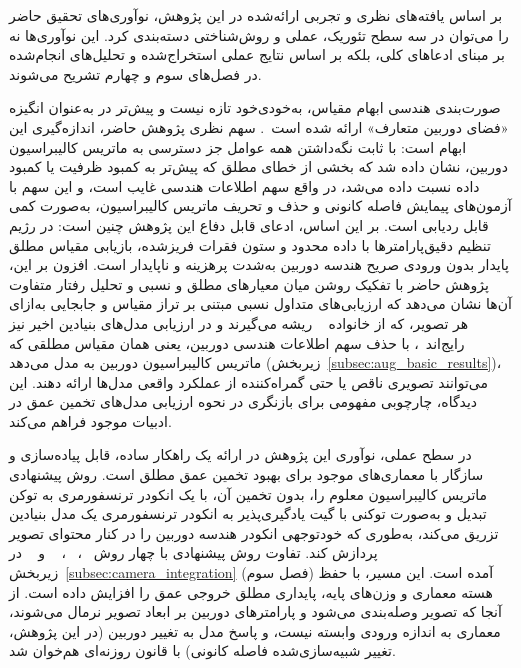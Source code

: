 بر اساس یافته‌های نظری و تجربی ارائه‌شده در این پژوهش،
نوآوری‌های تحقیق حاضر را می‌توان
در سه سطح تئوریک، عملی و روش‌شناختی دسته‌بندی کرد.
این نوآوری‌ها نه بر مبنای ادعاهای کلی،
بلکه بر اساس نتایج عملی استخراج‌شده
و تحلیل‌های انجام‌شده در فصل‌های سوم و چهارم
تشریح می‌شوند.

صورت‌بندی هندسی ابهام مقیاس، به‌خودی‌خود تازه نیست و پیش‌تر در
 به‌عنوان انگیزه «فضای دوربین متعارف» ارائه شده
است~\cite{Yin2023Metric3D}. سهم نظری پژوهش حاضر، اندازه‌گیری این
ابهام است: با ثابت نگه‌داشتن همه عوامل جز دسترسی به ماتریس کالیبراسیون دوربین، نشان داده شد که
بخشی از خطای مطلق که پیش‌تر به کمبود ظرفیت یا کمبود داده نسبت داده می‌شد،
در واقع سهم اطلاعات هندسی غایب است، و این سهم با آزمون‌های پیمایش فاصله کانونی و حذف
و تحریف ماتریس کالیبراسیون، به‌صورت کمی قابل ردیابی است.
بر این اساس، ادعای قابل دفاع این پژوهش چنین است: در رژیم تنظیم دقیق‌پارامترها با داده
محدود و ستون فقرات فریزشده، بازیابی مقیاس مطلق پایدار بدون ورودی
صریح هندسه دوربین به‌شدت پرهزینه و ناپایدار است.
افزون بر این، پژوهش حاضر با تفکیک روشن میان معیارهای مطلق و نسبی و تحلیل رفتار متفاوت آن‌ها نشان می‌دهد که ارزیابی‌های متداول نسبی مبتنی بر تراز مقیاس و جابجایی به‌ازای هر تصویر، که از خانواده ~\cite{Ranftl2019Robust} ریشه می‌گیرند و در ارزیابی مدل‌های بنیادین اخیر نیز رایج‌اند~\cite{DepthAnythingV2}، با حذف سهم اطلاعات هندسی دوربین، یعنی همان مقیاس مطلقی که ماتریس کالیبراسیون دوربین به مدل می‌دهد (زیربخش~\ref{subsec:aug_basic_results})، می‌توانند تصویری ناقص یا حتی گمراه‌کننده از عملکرد واقعی مدل‌ها ارائه دهند.
این دیدگاه،
چارچوبی مفهومی برای بازنگری
در نحوه ارزیابی مدل‌های تخمین عمق
در ادبیات موجود فراهم می‌کند.

در سطح عملی،
نوآوری این پژوهش
در ارائه یک راهکار ساده، قابل پیاده‌سازی
و سازگار با معماری‌های موجود
برای بهبود تخمین عمق مطلق است.
روش پیشنهادی ماتریس کالیبراسیون معلوم را، بدون تخمین آن، با یک انکودر ترنسفورمری به توکن تبدیل
و به‌صورت توکنی با گیت یادگیری‌پذیر به انکودر ترنسفورمری یک مدل بنیادین تزریق می‌کند،
به‌طوری که خودتوجهی انکودر هندسه دوربین را در کنار محتوای تصویر پردازش کند.
تفاوت روش پیشنهادی با چهار روش ~\cite{Facil2019CAMConvs}، ~\cite{Yin2023Metric3D}، ~\cite{Piccinelli2024UniDepth} و ~\cite{Bochkovskii2025DepthPro} در زیربخش~\ref{subsec:camera_integration} (فصل سوم) آمده است.
این مسیر، با حفظ هسته معماری و وزن‌های پایه،
پایداری مطلق خروجی عمق را افزایش داده است.
از آنجا که تصویر وصله‌بندی می‌شود و پارامترهای دوربین بر ابعاد تصویر نرمال می‌شوند،
معماری به اندازه ورودی وابسته نیست،
و پاسخ مدل به تغییر دوربین (در این پژوهش، تغییر شبیه‌سازی‌شده فاصله کانونی)
با قانون روزنه‌ای هم‌خوان شد.

